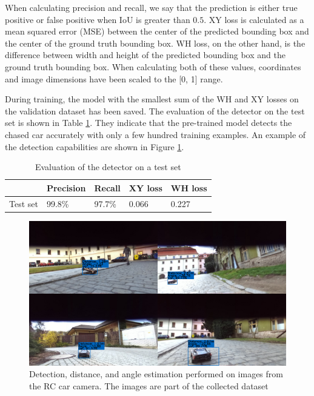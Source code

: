 \documentclass{ctuthesis/ctuthesis}
\begin{document}
When calculating precision and recall, we say that the prediction is either true positive or false positive when IoU is greater than $0.5$. XY loss is calculated as a mean squared error (MSE) between the center of the predicted bounding box and the center of the ground truth bounding box. WH loss, on the other hand, is the difference between width and height of the predicted bounding box and the ground truth bounding box. When calculating both of these values, coordinates and image dimensions have been scaled to the [0, 1] range. \par

During training, the model with the smallest sum of the WH and XY losses on the validation dataset has been saved. The evaluation of the detector on the test set is shown in Table \ref{tab:detection}. They indicate that the pre-trained model detects the chased car accurately with only a few hundred training examples. An example of the detection capabilities are shown in Figure \ref{f:detection_images}. 

\begin{table}[]
\begin{tabular}{l|llll}
\hline
            & Precision & Recall & XY loss & WH loss \\ \hline
Test set & 99.8\%    & 97.7\% & 0.066   & 0.227   \\ \hline
\end{tabular}
\caption{Evaluation of the detector on a test set}\label{tab:detection}
\end{table}



\begin{figure}[]
    \centering
    \includegraphics[width=1\textwidth]{images/detection_collage.pdf}
    
    \caption{Detection, distance, and angle estimation performed on images from the RC car camera. The images are part of the collected dataset}\label{f:detection_images}
\end{figure}
\end{document}
